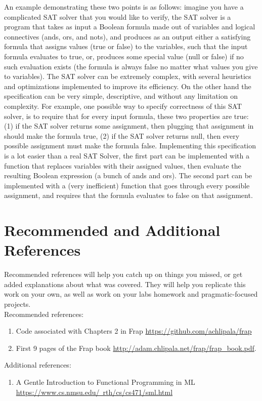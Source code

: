 \documentclass{article}
\begin{document}
An example demonstrating these two points is as follows: imagine you have a complicated SAT solver that you would like to verify, the SAT
solver is a program that takes as input a Boolean formula made out of variables and logical connectives (ands, ors, and nots), and produces as 
an output either a satisfying formula that assigns values (true or false) to the variables, such that the input formula evaluates to true, or, produces
some special value (null or false) if no such evaluation exists (the formula is always false no matter what values you give to variables). The SAT 
solver can be extremely complex, with several heuristics and optimizations implemented to improve its efficiency. On the other hand the specification can be
very simple, descriptive, and without any limitation on complexity. For example, one possible way to specify correctness of this SAT solver, is to require
that for every input formula, these two properties are true: (1) if the SAT solver returns some assignment, then plugging that assignment in should make the
formula true, (2) if the SAT solver returns null, then every possible assignment must make the formula false. Implementing this specification is a lot
easier than a real SAT Solver, the first part can be implemented with a function that replaces variables with their assigned values, then evaluate the resulting
Boolean expression (a bunch of ands and ors). The second part can be implemented with a (very inefficient) function that goes through every possible assignment,
and requires that the formula evaluates to false on that assignment.

\section{Recommended and Additional References}

Recommended references will help you catch up on things you missed, or get added explanations about what was covered. They will help you replicate this work on your own, as well as work on your labs homework and pragmatic-focused projects. \\

Recommended references:
\begin{enumerate}
    \item Code associated with Chapters 2 in Frap \href{https://github.com/achlipala/frap}{https://github.com/achlipala/frap}
    \item First 9 pages of the Frap book \href{http://adam.chlipala.net/frap/frap\_book.pdf}{http://adam.chlipala.net/frap/frap\_book.pdf}.
\end{enumerate}

Additional references:
\begin{enumerate}
    \item A Gentle Introduction to Functional Programming in ML \href{https://www.cs.nmsu.edu/~rth/cs/cs471/sml.html}{https://www.cs.nmsu.edu/~rth/cs/cs471/sml.html}
\end{enumerate}
\end{document}
